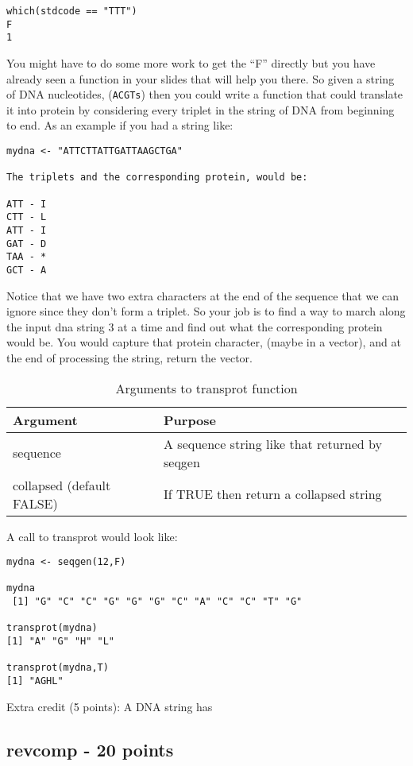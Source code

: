 \documentclass{article}
\begin{document}
\begin{verbatim}
which(stdcode == "TTT")
F 
1
\end{verbatim}
You might have to do some more work to get the ``F'' directly but you have already seen a function in your slides that will help you there. So given a string of DNA nucleotides, (\texttt{ACGTs}) then you could write a function that could translate it into protein by considering every triplet in the string of DNA from beginning to end. As an example if you had a string like:
\begin{verbatim}
mydna <- "ATTCTTATTGATTAAGCTGA"

The triplets and the corresponding protein, would be: 

ATT - I 
CTT - L
ATT - I
GAT - D
TAA - * 
GCT - A

\end{verbatim}
Notice that we have two extra characters at the end of the sequence that we can ignore since they don't form a triplet. So your job is to find a way to march along the input dna string 3 at a time and find out what the corresponding protein would be. You would capture that protein character, (maybe in a vector), and at the end of processing the string, return the vector.

\begin{table}[ht]
\caption{Arguments to transprot function}
\begin{tabular}{l | l}
\hline\hline
Argument & Purpose \\ [1ex]
\hline
sequence & A sequence string like that returned by seqgen \\ [1ex]
\hline  
collapsed (default FALSE) & If TRUE then return a collapsed string \\
\hline
\end{tabular}
\label{table:nonlin}
\end{table}

A call to transprot would look like:
\begin{verbatim}
mydna <- seqgen(12,F)

mydna
 [1] "G" "C" "C" "G" "G" "G" "C" "A" "C" "C" "T" "G"

transprot(mydna)
[1] "A" "G" "H" "L"

transprot(mydna,T)
[1] "AGHL"
\end{verbatim}

Extra credit (5 points): A DNA string has 
\subsection{revcomp - 20 points} 
\end{document}
